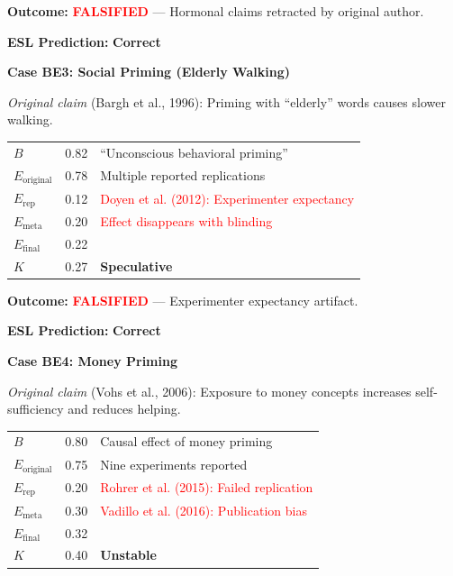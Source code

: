 \documentclass[11pt,a4paper]{article}
\begin{document}
\textbf{Outcome:} \textcolor{red}{\textbf{FALSIFIED}} --- Hormonal claims retracted by original author.

\textbf{ESL Prediction:} \checkmark \textbf{Correct}

\vspace{1em}

\textbf{Case BE3: Social Priming (Elderly Walking)}

\textit{Original claim} (Bargh et al., 1996): Priming with ``elderly'' words causes slower walking.

\begin{center}
\begin{tabular}{lcl}
\toprule
$B$ & 0.82 & ``Unconscious behavioral priming'' \\
$E_{\text{original}}$ & 0.78 & Multiple reported replications \\
$E_{\text{rep}}$ & 0.12 & \textcolor{red}{Doyen et al. (2012): Experimenter expectancy} \\
$E_{\text{meta}}$ & 0.20 & \textcolor{red}{Effect disappears with blinding} \\
\midrule
$E_{\text{final}}$ & 0.22 & \\
$K$ & 0.27 & \textbf{Speculative} \\
\bottomrule
\end{tabular}
\end{center}

\textbf{Outcome:} \textcolor{red}{\textbf{FALSIFIED}} --- Experimenter expectancy artifact.

\textbf{ESL Prediction:} \checkmark \textbf{Correct}

\vspace{1em}

\textbf{Case BE4: Money Priming}

\textit{Original claim} (Vohs et al., 2006): Exposure to money concepts increases self-sufficiency and reduces helping.

\begin{center}
\begin{tabular}{lcl}
\toprule
$B$ & 0.80 & Causal effect of money priming \\
$E_{\text{original}}$ & 0.75 & Nine experiments reported \\
$E_{\text{rep}}$ & 0.20 & \textcolor{red}{Rohrer et al. (2015): Failed replication} \\
$E_{\text{meta}}$ & 0.30 & \textcolor{red}{Vadillo et al. (2016): Publication bias} \\
\midrule
$E_{\text{final}}$ & 0.32 & \\
$K$ & 0.40 & \textbf{Unstable} \\
\bottomrule
\end{tabular}
\end{center}
\end{document}
